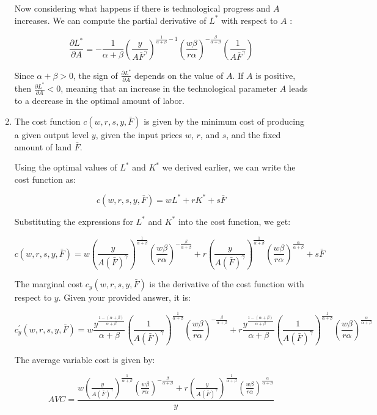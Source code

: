 \documentclass[UTF8,titlepage]{article}
\numberwithin{figure}{section}
\begin{document}
\begin{enumerate}
Now considering what happens if there is technological progress and \( A \) increases. We can compute the partial derivative of \( L^{*} \) with respect to \( A \) :

\[
\frac{\partial L^{*}}{\partial A}=-\frac{1}{\alpha+\beta}\left(\frac{y}{A\bar{F}^{\gamma}}\right)^{\frac{1}{\alpha+\beta}-1}\left(\frac{w \beta}{r \alpha}\right)^{-\frac{\beta}{\alpha+\beta}}\left(\frac{1}{A\bar{F}^{\gamma}}\right)
\]

Since \( \alpha+\beta>0 \), the sign of \( \frac{\partial L^{*}}{\partial A} \) depends on the value of \( A \). If \( A \) is positive, then \( \frac{\partial L^{*}}{\partial A}<0 \), meaning that an increase in the technological parameter \( A \) leads to a decrease in the optimal amount of labor. 

\item The cost function \(c(w, r, s, y, \bar{F})\) is given by the minimum cost of producing a given output level \(y\), given the input prices \(w\), \(r\), and \(s\), and the fixed amount of land \(\bar{F}\). 

Using the optimal values of \(L^{*}\) and \(K^{*}\) we derived earlier, we can write the cost function as:

$$
c(w, r, s, y, \bar{F}) = wL^{*} + rK^{*} + s\bar{F}
$$

Substituting the expressions for \(L^{*}\) and \(K^{*}\) into the cost function, we get:

$$
c(w, r, s, y, \bar{F}) = w\left(\frac{y}{A(\bar{F})^{\gamma}}\right)^{\frac{1}{\alpha+\beta}}\left(\frac{w\beta }{r\alpha}\right)^{-\frac{\beta}{\alpha+\beta}} + r\left(\frac{y}{A(\bar{F})^{\gamma}}\right)^{\frac{1}{\alpha+\beta}}\left(\frac{w\beta }{r\alpha}\right)^{\frac{\alpha}{\alpha+\beta}} + s\bar{F}
$$

The marginal cost \(c_{y}(w, r, s, y, \bar{F})\) is the derivative of the cost function with respect to \(y\). Given your provided answer, it is:

$$
c_{y}^{\prime}(w, r, s, y, \bar{F})=w\frac{y^{\frac{1-(\alpha+\beta)}{\alpha+\beta}}}{\alpha+\beta}\left(\frac{1}{A(\bar{F})^{\gamma}}\right)^{\frac{1}{\alpha+\beta}}\left(\frac{w\beta}{r\alpha}\right)^{-\frac{\beta}{\alpha+\beta}}+r\frac{y^{\frac{1-(\alpha+\beta)}{\alpha+\beta}}}{\alpha+\beta}\left(\frac{1}{A(\bar{F})^{\gamma}}\right)^{\frac{1}{\alpha+\beta}}\left(\frac{w\beta}{r\alpha}\right)^{\frac{\alpha}{\alpha+\beta}}
$$

The average variable cost is given by:

$$
AVC = \frac{w\left(\frac{y}{A(\bar{F})^{\gamma}}\right)^{\frac{1}{\alpha+\beta}}\left(\frac{w\beta }{r\alpha}\right)^{-\frac{\beta}{\alpha+\beta}} + r\left(\frac{y}{A(\bar{F})^{\gamma}}\right)^{\frac{1}{\alpha+\beta}}\left(\frac{w\beta }{r\alpha}\right)^{\frac{\alpha}{\alpha+\beta}}}{y}
$$



\end{enumerate}
\end{document}
